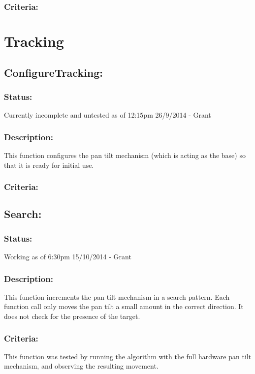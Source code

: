 \documentclass[]{report}
\begin{document}
\subsubsection{Criteria:}

\newpage
\section{Tracking}

\subsection{ConfigureTracking:}
\subsubsection{Status:}
Currently incomplete and untested as of 12:15pm 26/9/2014 - Grant

\subsubsection{Description:}
This function configures the pan tilt mechanism (which is acting as the base) so that it is ready for initial use.

\subsubsection{Criteria:}

\subsection{Search:}
\subsubsection{Status:}
Working as of 6:30pm 15/10/2014 - Grant

\subsubsection{Description:}
This function increments the pan tilt mechanism in a search pattern. Each function call only moves the pan tilt a small amount in the correct direction. It does not check for the presence of the target.

\subsubsection{Criteria:}
This function was tested by running the algorithm with the full hardware pan tilt mechanism, and observing the resulting movement.
\end{document}
